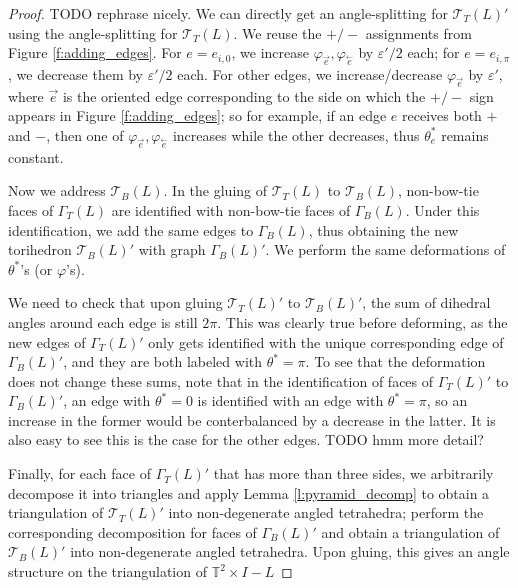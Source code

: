 \documentclass[11pt]{amsart}
\newcommand{\lemref}[1]{Lemma \ref{#1}}
\newcommand{\figref}[1]{Figure \ref{#1}}
\newcommand{\torus}{{\mathbb{T}^2}}
\newcommand{\sT}{{\mathcal{T}}}
\newcommand{\cev}[1]{\overset{\leftarrow}{#1}}
\newcommand{\vphi}{\varphi}
\newcommand{\veps}{\varepsilon}
\newcommand{\toruscomp}[1]{{\torus \times I - #1}}
\theoremstyle{plain}
\theoremstyle{definition}
\begin{document}
\begin{proof}
TODO rephrase nicely.
We can directly get an angle-splitting for $\sT_T(L)'$
using the angle-splitting for $\sT_T(L)$.
We reuse the $+/-$ assignments from \figref{f:adding_edges}.
For $e = e_{i,0}$, we increase $\vphi_{\vec{e}}, \vphi_{\cev{e}}$
by $\veps'/2$ each; for $e = e_{i,\pi}$,
we decrease them by $\veps'/2$ each.
For other edges, we increase/decrease $\vphi_{\vec{e}}$ by $\veps'$,
where $\vec{e}$ is the oriented edge corresponding to the side
on which the $+/-$ sign appears in \figref{f:adding_edges};
so for example, if an edge $e$ receives both $+$ and $-$,
then one of $\vphi_{\vec{e}},\vphi_{\cev{e}}$ increases
while the other decreases, thus $\theta_e^*$ remains constant.


Now we address $\sT_B(L)$.
In the gluing of $\sT_T(L)$ to $\sT_B(L)$,
non-bow-tie faces of $\Gamma_T(L)$ are identified with
non-bow-tie faces of $\Gamma_B(L)$.
Under this identification, we add the same edges to $\Gamma_B(L)$,
thus obtaining the new torihedron $\sT_B(L)'$ with graph
$\Gamma_B(L)'$.
We perform the same deformations of $\theta^*$'s (or $\vphi$'s).


We need to check that upon gluing $\sT_T(L)'$ to $\sT_B(L)'$,
the sum of dihedral angles around each edge is still $2\pi$.
This was clearly true before deforming, as the new edges of
$\Gamma_T(L)'$ only gets identified with the unique
corresponding edge of $\Gamma_B(L)'$, and they are both labeled
with $\theta^* = \pi$.
To see that the deformation does not change these sums,
note that in the identification of faces of $\Gamma_T(L)'$
to $\Gamma_B(L)'$,
an edge with $\theta^*=0$ is identified with an edge with
$\theta^*=\pi$,
so an increase in the former would be conterbalanced by
a decrease in the latter.
It is also easy to see this is the case for the other edges.
TODO hmm more detail?


Finally, for each face of $\Gamma_T(L)'$ that has more than three sides,
we arbitrarily decompose it into triangles
and apply \lemref{l:pyramid_decomp}
to obtain a triangulation of $\sT_T(L)'$ into non-degenerate angled tetrahedra;
perform the corresponding decomposition for faces of
$\Gamma_B(L)'$ and obtain a triangulation of $\sT_B(L)'$
into non-degenerate angled tetrahedra.
Upon gluing, this gives an angle structure on the triangulation
of $\toruscomp{L}$
\end{proof}








\end{document}
